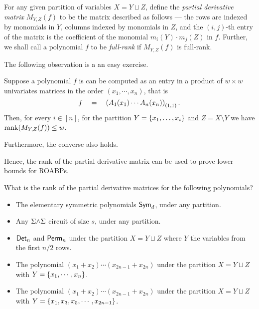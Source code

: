 \begin{definition} \label{defn:pdm-commutative}
For any given partition of variables $X = Y \sqcup Z$, define the \emph{partial derivative matrix} $M_{Y,Z}(f)$ to be the matrix described as follows --- the rows are indexed by monomials in $Y$, columns indexed by monomials in $Z$, and the $(i,j)$-th entry of the matrix is the coefficient of the monomial $m_i(Y)\cdot m_j(Z)$ in $f$. 
Further, we shall call a polynomial $f$ to be \emph{full-rank} if $M_{Y,Z}(f)$ is full-rank.
\end{definition}

\medskip

The following observation is a an easy exercise. 

\begin{lemma}
Suppose a polynomial $f$ is can be computed as an entry in a product of $w\times w$ univariates matrices in the order $(x_1,\cdots, x_n)$, that is
\[
f \quad = \quad \left(A_1(x_1) \cdots A_n(x_n) \right)_{(1,1)}.
\]
Then, for every $i \in [n]$, for the partition $Y = \left\{x_1, \ldots , x_{i}\right\}$ and $Z = X \setminus Y$ we have $\operatorname{rank}(M_{Y,Z}(f)) \leq w$. 

Furthermore, the converse also holds. 
\end{lemma}

Hence, the rank of the partial derivative matrix can be used to prove lower bounds for ROABPs. \\

\begin{exercise}\label{ex:pdm-rank}
What is the rank of the partial derivative matrices for the following polynomials? 
\begin{itemize}
\item The elementary symmetric polynomials $\operatorname{\mathsf{Sym}}_d$, under any partition.
\item Any $\Sigma\mathord{\wedge}\Sigma$ circuit of size $s$, under any partition.
\item $\operatorname{\mathsf{Det}}_n$ and $\operatorname{\mathsf{Perm}}_n$ under the partition $X = Y \sqcup Z$ where $Y$ the variables from the first $n/2$ rows. 
\item The polynomial $(x_1 + x_2) \cdots (x_{2n-1} + x_{2n})$ under the partition $X = Y \sqcup Z$ with $Y = \left\{x_1,\cdots, x_n\right\}$. 
\item The polynomial $(x_1 + x_2) \cdots (x_{2n-1} + x_{2n})$ under the partition $X = Y \sqcup Z$ with $Y = \left\{x_1,x_3,x_5,\cdots, x_{2n-1}\right\}$. 
\end{itemize}
\end{exercise}

